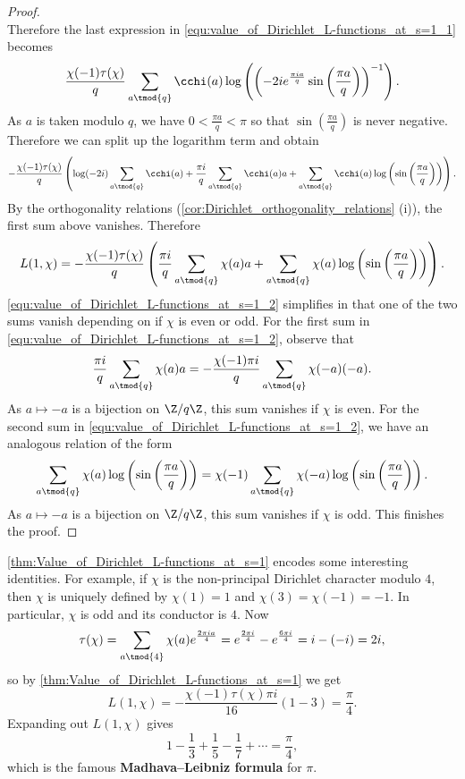 \begin{proof}
\[      \]
      Therefore the last expression in \cref{equ:value_of_Dirichlet_L-functions_at_s=1_1} becomes
      \[
        \frac{\chi(-1)\tau(\chi)}{q}\sum_{a \tmod{q}}\cchi(a)\log\left(\left(-2ie^{\frac{\pi ia}{q}}\sin\left(\frac{\pi a}{q}\right)\right)^{-1}\right).
      \]
      As $a$ is taken modulo $q$, we have $0 < \frac{\pi a}{q} < \pi$ so that $\sin\left(\frac{\pi a}{q}\right)$ is never negative. Therefore we can split up the logarithm term and obtain
      \[
        -\frac{\chi(-1)\tau(\chi)}{q}\left(\log(-2i)\sum_{a \tmod{q}}\cchi(a)+\frac{\pi i}{q}\sum_{a \tmod{q}}\cchi(a)a+\sum_{a \tmod{q}}\cchi(a)\log\left(\sin\left(\frac{\pi a}{q}\right)\right)\right).
      \]
      By the orthogonality relations (\cref{cor:Dirichlet_orthogonality_relations} (i)), the first sum above vanishes. Therefore
      \begin{equation}\label{equ:value_of_Dirichlet_L-functions_at_s=1_2}
        L(1,\chi) = -\frac{\chi(-1)\tau(\chi)}{q}\left(\frac{\pi i}{q}\sum_{a \tmod{q}}\chi(a)a+\sum_{a \tmod{q}}\chi(a)\log\left(\sin\left(\frac{\pi a}{q}\right)\right)\right).
      \end{equation}
      \cref{equ:value_of_Dirichlet_L-functions_at_s=1_2} simplifies in that one of the two sums vanish depending on if $\chi$ is even or odd. For the first sum in \cref{equ:value_of_Dirichlet_L-functions_at_s=1_2}, observe that
      \[
        \frac{\pi i}{q}\sum_{a \tmod{q}}\chi(a)a = -\frac{\chi(-1)\pi i}{q}\sum_{a \tmod{q}}\chi(-a)(-a).
      \]
      As $a \mapsto -a$ is a bijection on $\Z/q\Z$, this sum vanishes if $\chi$ is even. For the second sum in \cref{equ:value_of_Dirichlet_L-functions_at_s=1_2}, we have an analogous relation of the form
      \[
        \sum_{a \tmod{q}}\chi(a)\log\left(\sin\left(\frac{\pi a}{q}\right)\right) = \chi(-1)\sum_{a \tmod{q}}\chi(-a)\log\left(\sin\left(\frac{\pi a}{q}\right)\right).
      \]
      As $a \mapsto -a$ is a bijection on $\Z/q\Z$, this sum vanishes if $\chi$ is odd. This finishes the proof.
    \end{proof}

    \cref{thm:Value_of_Dirichlet_L-functions_at_s=1} encodes some interesting identities. For example, if $\chi$ is the non-principal Dirichlet character modulo $4$, then $\chi$ is uniquely defined by $\chi(1) = 1$ and $\chi(3) = \chi(-1) = -1$. In particular, $\chi$ is odd and its conductor is $4$. Now
    \[
      \tau(\chi) = \sum_{a \tmod{4}}\chi(a)e^{\frac{2\pi ia}{4}} = e^{\frac{2\pi i}{4}}-e^{\frac{6\pi i}{4}} = i-(-i) = 2i,
    \]
    so by \cref{thm:Value_of_Dirichlet_L-functions_at_s=1} we get
    \[
      L(1,\chi) = -\frac{\chi(-1)\tau(\chi)\pi i}{16}(1-3) = \frac{\pi}{4}.
    \]
    Expanding out $L(1,\chi)$ gives
    \[
      1-\frac{1}{3}+\frac{1}{5}-\frac{1}{7}+\cdots = \frac{\pi}{4},
    \]
    which is the famous \textbf{Madhava–Leibniz formula} for $\pi$.
